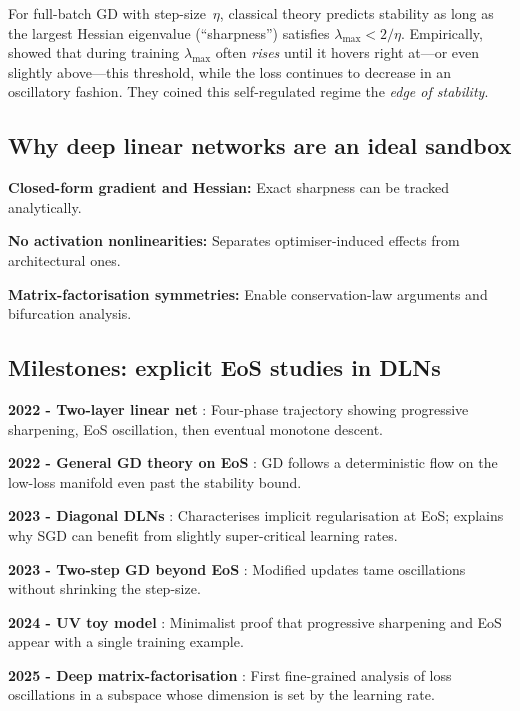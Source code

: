 \documentclass[11pt]{article}
\begin{document}
For full-batch GD with step-size~$\eta$, classical theory predicts
stability as long as the largest Hessian eigenvalue (``sharpness'')
satisfies $\lambda_{\max}<2/\eta$.  Empirically, \citet{cohen2021gradient}
showed that during training $\lambda_{\max}$ often \emph{rises} until it
hovers right at—or even slightly above—this threshold, while the loss
continues to decrease in an oscillatory fashion.  They coined this
self-regulated regime the \emph{edge of stability}.

\subsection{Why deep linear networks are an ideal sandbox}

\textbf{Closed-form gradient and Hessian:} Exact sharpness can be tracked analytically.

\textbf{No activation nonlinearities:} Separates optimiser-induced effects from architectural ones.

\textbf{Matrix-factorisation symmetries:} Enable conservation-law arguments and bifurcation analysis.

\subsection{Milestones: explicit EoS studies in DLNs}

\textbf{2022 - Two-layer linear net} \citep{Li2022SharpnessEoS}: Four-phase trajectory showing progressive sharpening, EoS oscillation, then eventual monotone descent.

\textbf{2022 - General GD theory on EoS} \citep{Arora2022Understanding}: GD follows a deterministic flow on the low-loss manifold even past the stability bound.

\textbf{2023 - Diagonal DLNs} \citep{Labarriere2024DiagonalDLN}: Characterises implicit regularisation at EoS; explains why SGD can benefit from slightly super-critical learning rates.

\textbf{2023 - Two-step GD beyond EoS} \citep{Chen2023TwoStep}: Modified updates tame oscillations without shrinking the step-size.

\textbf{2024 - UV toy model} \citep{Kalra2023Universal}: Minimalist proof that progressive sharpening and EoS appear with a single training example.

\textbf{2025 - Deep matrix-factorisation} \citep{Ghosh2025DeepMF}: First fine-grained analysis of loss oscillations in a subspace whose dimension is set by the learning rate.
\end{document}
